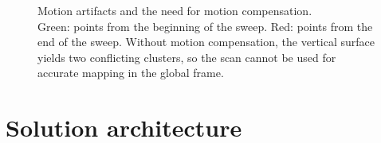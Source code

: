 \begin{figure}
    \centering
    \hspace{1pt}
    \caption[Before and after motion compensation]{Motion artifacts and the need for motion compensation. \\Green: points from the beginning of the sweep. Red: points from the end of the sweep. Without motion compensation, the vertical surface yields two conflicting clusters, so the scan cannot be used for accurate mapping in the global frame.}
    \label{fig:motion-comp}
\end{figure}



\section{Solution architecture}






